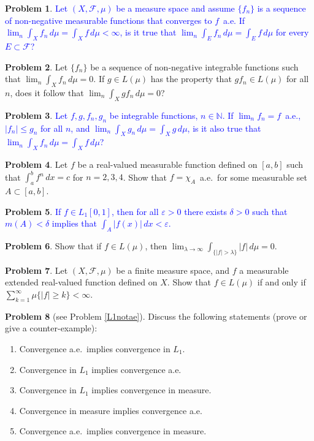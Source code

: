 \documentclass[12pt,reqno]{amsart}
\def\field#1{\mathbb{#1}}
\def\abs#1{\lvert {#1} \rvert}
\theoremstyle{definition}
\newtheorem{problem}{Problem}
\theoremstyle{remark}
\begin{document}
\begin{problem}
  \textcolor{blue}{Let $(X, \mathcal{F}, \mu)$ be a measure space and
    assume $\{ f_n \}$ is a sequence of non-negative measurable
    functions that converges to $f$~a.e.  If $\lim_n \int_X f_n\, d\mu
    = \int_X f\, d\mu < \infty$, is it true that $\lim_n \int_E f_n\,
    d\mu = \int_E f\, d\mu$ for every $E \subset \mathcal{F}$?}
\end{problem}
\begin{problem}
  Let $\{ f_n \}$ be a sequence of non-negative integrable functions
  such that $\lim_n \int_X f_n\, d\mu = 0$.  If $g \in L(\mu)$ has the
  property that $g f_n \in L(\mu)$ for all $n$, does it follow that
  $\lim_n \int_X gf_n\, d\mu = 0$?
\end{problem}
\begin{problem}
  \textcolor{blue}{Let $f, g, f_n, g_n$ be integrable functions, $n \in
    \field{N}$. If $\lim_n f_n = f$~a.e., $\abs{f_n} \leq g_n$ for all
    $n$, and $\lim_n \int_X g_n\, d\mu = \int_X g\, d\mu$, is it also
    true that $\lim_n \int_X f_n\, d\mu = \int_X f\, d\mu$?}
\end{problem}
\begin{problem}
  Let $f$ be a real-valued measurable function defined on $[a,b]$ such
  that $\int_a^b f^n\, dx = c$ for $n=2,3,4$.  Show that $f =
  \chi_A$~a.e.~for some measurable set $A \subset [a,b]$.
\end{problem}

\begin{problem}
  \textcolor{blue}{If $f \in L_1[0,1]$, then for all $\varepsilon >0$
    there exists $\delta > 0$ such that $m(A) < \delta$ implies that
    $\int_A \abs{f(x)}\, dx < \varepsilon$.}
\end{problem}
\begin{problem}
  Show that if $f \in L(\mu)$, then $\lim_{\lambda\to \infty}
  \int_{\{\abs{f} > \lambda\}} \abs{f}\, d\mu = 0$.
\end{problem}
\begin{problem}
  Let $(X, \mathcal{F}, \mu)$ be a finite measure space, and $f$ a
  measurable extended real-valued function defined on $X$.  Show that
  $f \in L(\mu)$ if and only if $\sum_{k=1}^\infty \mu\{ \abs{f} \geq
  k \} < \infty$.
\end{problem}
\begin{problem}[see Problem \ref{L1notae}]
  Discuss the following statements (prove or give a counter-example):
  \begin{enumerate}
  \item Convergence a.e.~implies convergence in $L_1$.
  \item Convergence in $L_1$ implies convergence a.e.
  \item Convergence in $L_1$ implies convergence in measure.
  \item Convergence in measure implies convergence a.e.
  \item Convergence a.e.~implies convergence in measure.
  \end{enumerate}
\end{problem}
\end{document}
